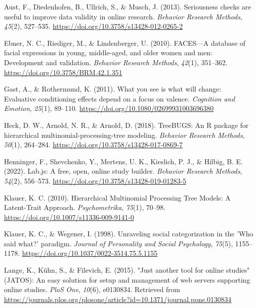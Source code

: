 \documentclass[
  doc,floatsintext]{apa6}
\newlength{\cslhangindent}
\newenvironment{CSLReferences}[2] %
 {\begin{list}{}{%
  \setlength{\itemindent}{0pt}
  \setlength{\leftmargin}{0pt}
  \setlength{\parsep}{0pt}
  \ifodd #1
   \setlength{\leftmargin}{\cslhangindent}
   \setlength{\itemindent}{-1\cslhangindent}
  \fi
  \setlength{\itemsep}{#2\baselineskip}}}
 {\end{list}}
\begin{document}
\label{refs}
\begin{CSLReferences}{1}{0}
Aust, F., Diedenhofen, B., Ullrich, S., \& Musch, J. (2013). Seriousness checks are useful to improve data validity in online research. \emph{Behavior Research Methods}, \emph{45}(2), 527--535. \url{https://doi.org/10.3758/s13428-012-0265-2}

Ebner, N. C., Riediger, M., \& Lindenberger, U. (2010). {FACES}---{A} database of facial expressions in young, middle-aged, and older women and men: {Development} and validation. \emph{Behavior Research Methods}, \emph{42}(1), 351--362. \url{https://doi.org/10.3758/BRM.42.1.351}

Gast, A., \& Rothermund, K. (2011). What you see is what will change: {Evaluative} conditioning effects depend on a focus on valence. \emph{Cognition and Emotion}, \emph{25}(1), 89--110. \url{https://doi.org/10.1080/02699931003696380}

Heck, D. W., Arnold, N. R., \& Arnold, D. (2018). {TreeBUGS}: {An R} package for hierarchical multinomial-processing-tree modeling. \emph{Behavior Research Methods}, \emph{50}(1), 264--284. \url{https://doi.org/10.3758/s13428-017-0869-7}

Henninger, F., Shevchenko, Y., Mertens, U. K., Kieslich, P. J., \& Hilbig, B. E. (2022). Lab.js: {A} free, open, online study builder. \emph{Behavior Research Methods}, \emph{54}(2), 556--573. \url{https://doi.org/10.3758/s13428-019-01283-5}

Klauer, K. C. (2010). Hierarchical {Multinomial Processing Tree Models}: {A Latent-Trait Approach}. \emph{Psychometrika}, \emph{75}(1), 70--98. \url{https://doi.org/10.1007/s11336-009-9141-0}

Klauer, K. C., \& Wegener, I. (1998). Unraveling social categorization in the '{Who} said what?' paradigm. \emph{Journal of Personality and Social Psychology}, \emph{75}(5), 1155--1178. \url{https://doi.org/10.1037/0022-3514.75.5.1155}

Lange, K., Kühn, S., \& Filevich, E. (2015). "{Just} another tool for online studies" ({JATOS}): {An} easy solution for setup and management of web servers supporting online studies. \emph{PloS One}, \emph{10}(6), e0130834. Retrieved from \url{https://journals.plos.org/plosone/article?id=10.1371/journal.pone.0130834}


\end{CSLReferences}
\end{document}
